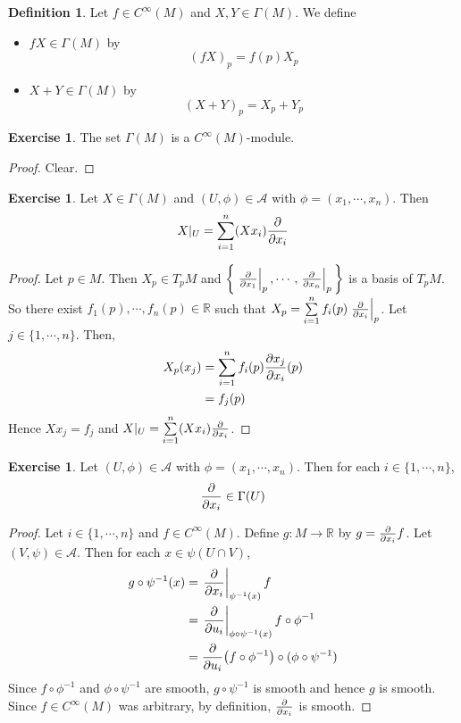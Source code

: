 \documentclass[12pt]{amsart}
\theoremstyle{definition}
\newtheorem{defn}[definition]{Definition}
\theoremstyle{remark}
\theoremstyle{definition}
\newtheorem{ex}[definition]{Exercise}
\newcommand{\Gam}{\Gamma}
\newcommand{\R}{\mathbb{R}}
\newcommand{\MA}{\mathcal{A}}
\begin{document}
	\begin{defn}
	Let $f \in C^{\infty}(M)$ and $X,Y \in \Gam(M)$. We define 
	\begin{itemize}
	\item $fX \in \Gam(M)$ by $$(fX)_p = f(p)X_p$$
	\item $X+Y \in \Gam(M)$ by $$(X+Y)_p = X_p+Y_p$$
	\end{itemize}
	\end{defn}
	
	\begin{ex}
	The set $\Gam(M)$ is a $C^{\infty}(M)$-module.
	\end{ex}
	
	\begin{proof}
	Clear.
	\end{proof}

	\begin{ex}
		Let $X \in \Gam(M)$ and $(U, \phi) \in \MA$ with $\phi = (x_1, \cdots, x_n)$. Then $$X|_U = \sum_{i=1}^n (Xx_i) \pdv{x_i}$$ 
	\end{ex}

	\begin{proof}
		Let $p \in M$. Then $X_p \in T_pM$ and $\bigg \{ \eval{\pdv{x_{1}}}_{p}, \cdots, \eval{\pdv{x_{n}}}_{p} \bigg \}$ is a basis of $T_pM$. So there exist $f_1(p), \cdots, f_n(p) \in \R$ such that $X_p = \sum\limits_{i=1}^n f_i(p) \eval{\pdv{x_i}}_{p}$. Let $j \in \{1, \cdots, n\}$. Then,
		\begin{align*}
			X_p(x_j) 
			&= \sum\limits_{i=1}^n f_i(p) {\pdv{x_j}{x_i}}(p) \\
			&= f_j(p) \\
		\end{align*} 
		Hence $Xx_j = f_j$ and $X|_U = \sum\limits_{i=1}^n (Xx_i) \pdv{x_i}$.
	\end{proof}
	
	\begin{ex}
	Let $(U, \phi) \in \MA$ with $\phi = (x_1, \cdots, x_n)$. Then for each $i \in \{1, \cdots, n\}$, $$\pdv{x_i} \in \Gam(U)$$
	\end{ex}
	
	\begin{proof}
	Let $i \in \{1, \cdots, n\}$ and $f \in C^{\infty}(M)$. Define $g: M \rightarrow \R$ by $g = \pdv{x_i} f$. Let $(V, \psi) \in \MA$. Then for each $x \in \psi(U \cap V)$, 
	\begin{align*}
	g \circ \psi^{-1}(x) 
	&= \eval{\pdv{x_i}}_{\psi^{-1}(x)}f \\
	&= \eval{\pdv{u_i}}_{\phi \circ \psi^{-1}(x)}f \circ \phi^{-1}  \\
	&= \pdv{u_i}(f \circ \phi^{-1}) \circ (\phi \circ \psi^{-1}) \\
\end{align*}	 
	Since $f \circ \phi^{-1}$ and $\phi \circ \psi^{-1}$ are smooth, $g \circ \psi^{-1}$ is smooth and hence $g$ is smooth. Since $f \in C^{\infty}(M)$ was arbitrary, by definition, $\pdv{x_i}$ is smooth. 
	\end{proof}
	
\end{document}
